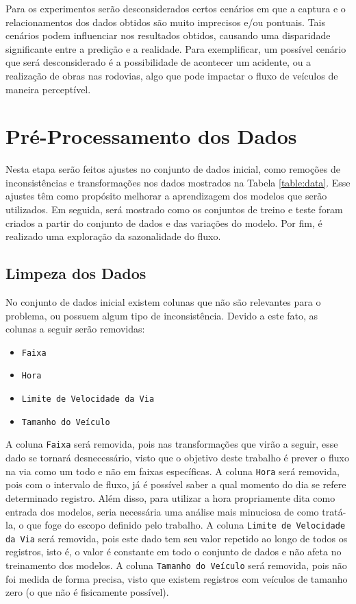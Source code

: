 Para os experimentos serão desconsiderados certos cenários em que a captura e o relacionamentos dos dados obtidos são muito imprecisos e/ou pontuais. Tais cenários podem influenciar nos resultados obtidos, causando uma disparidade significante entre a predição e a realidade. Para exemplificar, um possível cenário que será desconsiderado é a possibilidade de acontecer um acidente, ou a realização de obras nas rodovias, algo que pode impactar o fluxo de veículos de maneira perceptível.

\section{Pré-Processamento dos Dados}

Nesta etapa serão feitos ajustes no conjunto de dados inicial, como remoções de inconsistências e transformações nos dados mostrados na Tabela \ref{table:data}. Esse ajustes têm como propósito melhorar a aprendizagem dos modelos que serão utilizados. Em seguida, será mostrado como os conjuntos de treino e teste foram criados a partir do conjunto de dados e das variações do modelo. Por fim, é realizado uma exploração da sazonalidade do fluxo.

\subsection{Limpeza dos Dados}

No conjunto de dados inicial existem colunas que não são relevantes para o problema, ou possuem algum tipo de inconsistência. Devido a este fato, as colunas a seguir serão removidas:

\begin{itemize}
    \item \texttt{Faixa}
    \item  \texttt{Hora}
    \item \texttt{Limite de Velocidade da Via}
    \item  \texttt{Tamanho do Veículo}
\end{itemize}

A coluna \texttt{Faixa} será removida, pois nas transformações que virão a seguir, esse dado se tornará desnecessário, visto que o objetivo deste trabalho é prever o fluxo na via como um todo e não em faixas específicas. A coluna \texttt{Hora} será removida, pois com o intervalo de fluxo, já é possível saber a qual momento do dia se refere determinado registro. Além disso, para utilizar a hora propriamente dita como entrada dos modelos, seria necessária uma análise mais minuciosa de como tratá-la, o que foge do escopo definido pelo trabalho. A coluna \texttt{Limite de Velocidade da Via} será removida, pois este dado tem seu valor repetido ao longo de todos os registros, isto é, o valor é constante em todo o conjunto de dados e não afeta no treinamento dos modelos. A coluna \texttt{Tamanho do Veículo} será removida, pois não foi medida de forma precisa, visto que existem registros com veículos de tamanho zero (o que não é fisicamente possível).

